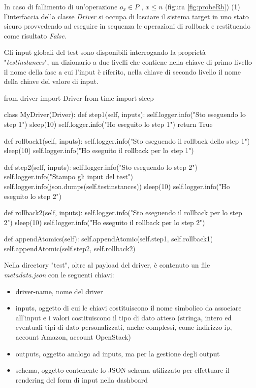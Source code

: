 \documentclass[../main.tex]{subfiles}
\begin{document}
In caso di fallimento di un'operazione $o_x \in P$ , $x \leq n$ (figura \ref{fig:probeRb}) (1) l'interfaccia della classe \textit{Driver} si occupa di lasciare il sistema target in uno stato sicuro provvedendo ad eseguire in sequenza le operazioni di rollback e restituendo come risultato \textit{False}.

Gli  input globali del test sono  disponibili interrogando la proprietà "\textit{testinstances}", un dizionario a due livelli che contiene nella chiave di primo livello il nome della fase a cui l'input è riferito, nella chiave di secondo livello il nome della chiave del valore di input.

\begin{python}

from driver import Driver
from time import sleep

class MyDriver(Driver):
    def step1(self, inputs):
        self.logger.info("Sto eseguendo lo step 1")
        sleep(10)
        self.logger.info("Ho eseguito lo step 1")
        return True

    def rollback1(self, inputs):
        self.logger.info("Sto eseguendo il rollback dello step 1")
        sleep(10)
        self.logger.info("Ho eseguito il rollback per lo step 1")

    def step2(self, inputs):
        self.logger.info("Sto eseguendo lo step 2")
        self.logger.info("Stampo gli input del test")
        self.logger.info(json.dumps(self.testinstances))
        sleep(10)
        self.logger.info("Ho eseguito lo step 2")
        
    def rollback2(self, inputs):
        self.logger.info("Sto eseguendo il rollback per lo step 2")
        sleep(10)        
        self.logger.info("Ho eseguito il rollback per lo step 2")

    def appendAtomics(self):
        self.appendAtomic(self.step1, self.rollback1)
        self.appendAtomic(self.step2, self.rollback2)
        
\end{python}

Nella directory "test", oltre al payload del driver, è contenuto un file \textit{metadata.json} 
con le seguenti chiavi:
\begin{itemize}
    \item driver-name, nome del driver
    \item inputs, oggetto di cui le chiavi costituiscono il nome simbolico da associare all'input e i valori costituiscono il tipo di dato atteso (stringa, intero ed eventuali tipi di dato personalizzati, anche complessi, come indirizzo ip, account Amazon, account OpenStack)
    \item outputs, oggetto analogo ad inputs, ma per la gestione degli output 
    \item schema, oggetto contenente lo JSON schema utilizzato per effettuare il rendering del form di input nella dashboard
\end{itemize}
\end{document}
